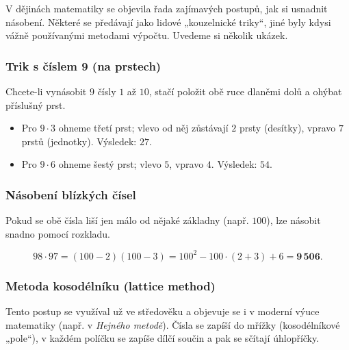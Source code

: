 \documentclass[12pt,a4paper]{article}
\begin{document}
V dějinách matematiky se objevila řada zajímavých postupů, jak si usnadnit násobení.  
Některé se předávají jako lidové „kouzelnické triky“, jiné byly kdysi vážně používanými metodami výpočtu.  
Uvedeme si několik ukázek.

\subsubsection*{Trik s číslem 9 (na prstech)}
Chcete-li vynásobit $9$ čísly $1$ až $10$, stačí položit obě ruce dlaněmi dolů a ohýbat příslušný prst.  
\begin{examplebox}
\begin{itemize}
    \item Pro $9\cdot 3$ ohneme třetí prst; vlevo od něj zůstávají $2$ prsty (desítky), vpravo $7$ prstů (jednotky). Výsledek: $27$.
    \item Pro $9\cdot 6$ ohneme šestý prst; vlevo $5$, vpravo $4$. Výsledek: $54$.
\end{itemize}
\end{examplebox}

\subsubsection*{Násobení blízkých čísel}
Pokud se obě čísla liší jen málo od nějaké základny (např. $100$), lze násobit snadno pomocí rozkladu.  
\begin{examplebox}
\[
98\cdot 97 = (100-2)(100-3) = 100^2 - 100\cdot(2+3) + 6 = \mathbf{9\,506}.
\]
\end{examplebox}

\subsubsection*{Metoda kosodélníku (lattice method)}

Tento postup se využíval už ve středověku a objevuje se i v moderní výuce matematiky (např. v \emph{Hejného metodě}).  
Čísla se zapíší do mřížky (kosodélníkové „pole“), v každém políčku se zapíše dílčí součin a pak se sčítají úhlopříčky.  
\end{document}
